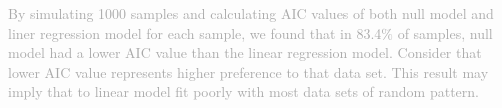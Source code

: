 \documentclass[12pt]{article}
\begin{document}
\noindent \textcolor{darkgray}{By simulating 1000 samples and calculating AIC values of both null model and liner regression model for each sample, we found that in 83.4$\%$ of samples, null model had a lower AIC value than the linear regression model. Consider that lower AIC value represents higher preference to that data set. This result may imply that to linear model fit poorly with most data sets of random pattern.}
\end{document}
